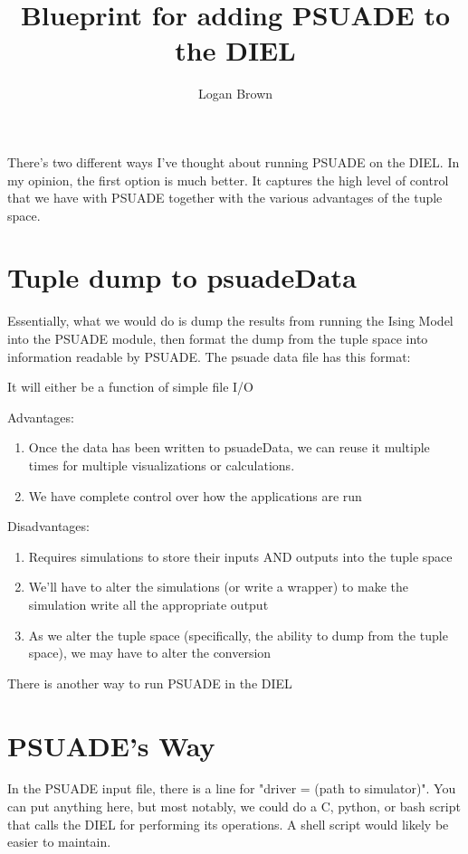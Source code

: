 \documentclass[11pt]{article} %
\title{Blueprint for adding PSUADE to the DIEL}
\author{Logan Brown}
\begin{document}
\maketitle


There's two different ways I've thought about running PSUADE on the DIEL. In my opinion, the first option is much better. It captures the high level of control that we have with PSUADE together with the various advantages of the tuple space.

\section{Tuple dump to psuadeData}

Essentially, what we would do is dump the results from running the Ising Model into the PSUADE module, then format the dump from the tuple space into information readable by PSUADE. The psuade data file has this format:


It will either be a function of simple file I/O 

Advantages:
\begin{enumerate}
	\item Once the data has been written to psuadeData, we can reuse it multiple times for multiple visualizations or calculations.
	\item We have complete control over how the applications are run
\end{enumerate}

Disadvantages:
\begin{enumerate}
	\item Requires simulations to store their inputs AND outputs into the tuple space
	\item We'll have to alter the simulations (or write a wrapper) to make the simulation write all the appropriate output
	\item As we alter the tuple space (specifically, the ability to dump from the tuple space), we may have to alter the conversion
\end{enumerate}

There is another way to run PSUADE in the DIEL

\section{PSUADE's Way}

In the PSUADE input file, there is a line for "driver = (path to simulator)". You can put anything here, but most notably, we could do a C, python, or bash script that calls the DIEL for performing its operations. A shell script would likely be easier to maintain.
\end{document}

